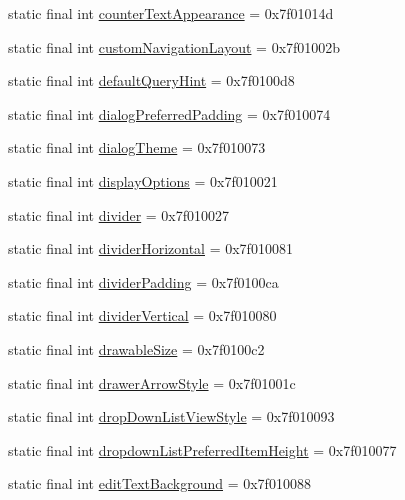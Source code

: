 \begin{CompactItemize}
static final int \hyperlink{classandroid_1_1support_1_1v4_1_1_r_1_1attr_d10dcd725ea37660b820772a2b7bb638}{counterTextAppearance} = 0x7f01014d
\item 
static final int \hyperlink{classandroid_1_1support_1_1v4_1_1_r_1_1attr_8d3fa3e7d089a5ef838770decb6237a2}{customNavigationLayout} = 0x7f01002b
\item 
static final int \hyperlink{classandroid_1_1support_1_1v4_1_1_r_1_1attr_259d105ff5c6843f5ceefa3280373ab7}{defaultQueryHint} = 0x7f0100d8
\item 
static final int \hyperlink{classandroid_1_1support_1_1v4_1_1_r_1_1attr_43c14a3aaa4878ffead1da7d07f2601f}{dialogPreferredPadding} = 0x7f010074
\item 
static final int \hyperlink{classandroid_1_1support_1_1v4_1_1_r_1_1attr_86227e47534b7ea4e4d0565a89b26147}{dialogTheme} = 0x7f010073
\item 
static final int \hyperlink{classandroid_1_1support_1_1v4_1_1_r_1_1attr_e6a6f84b45e6aa9ce300c8a476b6419b}{displayOptions} = 0x7f010021
\item 
static final int \hyperlink{classandroid_1_1support_1_1v4_1_1_r_1_1attr_5ce40ae40da07c6053d46d2cd9740133}{divider} = 0x7f010027
\item 
static final int \hyperlink{classandroid_1_1support_1_1v4_1_1_r_1_1attr_5a89c625aa8e02027c813453f5f27e54}{dividerHorizontal} = 0x7f010081
\item 
static final int \hyperlink{classandroid_1_1support_1_1v4_1_1_r_1_1attr_7d3d917328f2edd9985441f8be63d22c}{dividerPadding} = 0x7f0100ca
\item 
static final int \hyperlink{classandroid_1_1support_1_1v4_1_1_r_1_1attr_1a594aefe9a506d171a01c60057e3f81}{dividerVertical} = 0x7f010080
\item 
static final int \hyperlink{classandroid_1_1support_1_1v4_1_1_r_1_1attr_bb8e8326bf4ae7b5807884cccc8894cb}{drawableSize} = 0x7f0100c2
\item 
static final int \hyperlink{classandroid_1_1support_1_1v4_1_1_r_1_1attr_16eb6b23bde82ceb6ed501aa6d996bae}{drawerArrowStyle} = 0x7f01001c
\item 
static final int \hyperlink{classandroid_1_1support_1_1v4_1_1_r_1_1attr_671639976fd73cafb18ccb72fd6be3e7}{dropDownListViewStyle} = 0x7f010093
\item 
static final int \hyperlink{classandroid_1_1support_1_1v4_1_1_r_1_1attr_a38ee74775fd716e462d4eda74ca02f1}{dropdownListPreferredItemHeight} = 0x7f010077
\item 
static final int \hyperlink{classandroid_1_1support_1_1v4_1_1_r_1_1attr_cd4cce28f73e27262d57d299a4c60a7f}{editTextBackground} = 0x7f010088

\end{CompactItemize}
